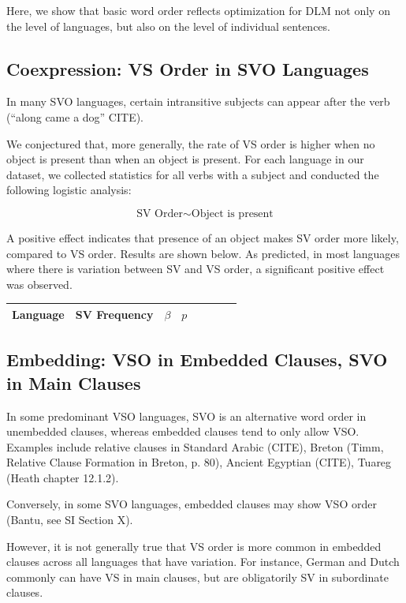 \documentclass[11pt,a4paper]{article}
\begin{document}
Here, we show that basic word order reflects optimization for DLM not only on the level of languages, but also on the level of individual sentences.

\subsection{Coexpression: VS Order in SVO Languages}
In many SVO languages, certain intransitive subjects can appear after the verb (``along came a dog'' CITE).


We conjectured that, more generally, the rate of VS order is higher when no object is present than when an object is present.
For each language in our dataset, we collected statistics for all verbs with a subject and conducted the following logistic analysis:

\begin{equation}
\text{SV Order} \sim \text{Object is present}
\end{equation}

A positive effect indicates that presence of an object makes SV order more likely, compared to VS order.
Results are shown below.
As predicted, in most languages where there is variation between SV and VS order, a significant positive effect was observed.

\begin{longtable}{l|lllllll}
Language & SV Frequency & $\beta$ & $p$ \\ \hline
%
\end{longtable}


\subsection{Embedding: VSO in Embedded Clauses, SVO in Main Clauses}
In some predominant VSO languages, SVO is an alternative word order in unembedded clauses, whereas embedded clauses tend to only allow VSO.
Examples include relative clauses in Standard Arabic (CITE), Breton (Timm, Relative Clause Formation in Breton, p. 80), Ancient Egyptian (CITE), Tuareg (Heath chapter 12.1.2).


Conversely, in some SVO languages, embedded clauses may show VSO order (Bantu, see SI Section X).

However, it is not generally true that VS order is more common in embedded clauses across all languages that have variation. For instance, German and Dutch commonly can have VS in main clauses, but are obligatorily SV in subordinate clauses.

\end{document}
